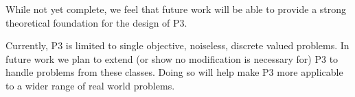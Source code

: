 \documentclass{sig-alternate}
\begin{document}
While not yet complete, we feel that future work will be able to provide a strong
theoretical foundation for the design of P3.
\begin{comment}
Here we have presented outlines
for a number of expected runtime proofs, some of which apply to complex problems.
Again, it is P3's mix of strongly elitist selection, paired with continuous integration
of random information that allows for this analysis which cannot be done for many
other state of the art techniques, such as LTGA.
\end{comment}

Currently, P3 is limited to single objective, noiseless, discrete valued problems.
In future work we plan to extend (or show no modification is necessary for) P3 to handle
problems from these classes.  Doing so will help make P3 more applicable to a wider
range of real world problems.

\begin{comment}
Finally, as future work we plan to investigate the individual pieces of P3 for
their usefulness.  While intuitively many of them fit together well, it is possible
that slight modification will allow for even better synergy.  Conversely, the population
pyramid scheme itself may combine well with other optimization techniques.
\end{comment}

%

%
%
\balancecolumns
\end{document}
